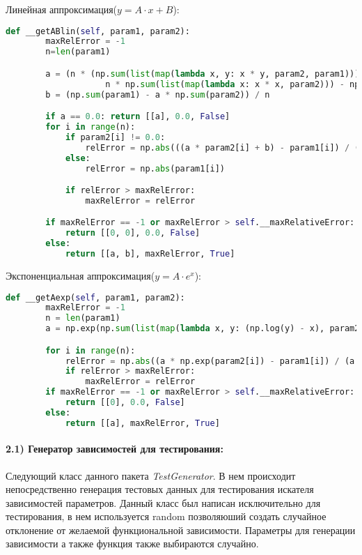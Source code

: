     Линейная аппроксимация($ y=A\cdot x + B$):
    \begin{lstlisting}[language=Python]
    def __getABlin(self, param1, param2):
        maxRelError = -1
        n=len(param1)

        a = (n * (np.sum(list(map(lambda x, y: x * y, param2, param1)))) - np.sum(param1) * np.sum(param2)) / (
                    n * np.sum(list(map(lambda x: x * x, param2))) - np.sum(param2) ** 2)
        b = (np.sum(param1) - a * np.sum(param2)) / n

        if a == 0.0: return [[a], 0.0, False]
        for i in range(n):
            if param2[i] != 0.0:
                relError = np.abs(((a * param2[i] + b) - param1[i]) / (a * param2[i] + b))
            else:
                relError = np.abs(param1[i])

            if relError > maxRelError:
                maxRelError = relError

        if maxRelError == -1 or maxRelError > self.__maxRelativeError:
            return [[0, 0], 0.0, False]
        else:
            return [[a, b], maxRelError, True]
    \end{lstlisting}

    Экспоненциальная аппроксимация($y=A\cdot e^x$):
    \begin{lstlisting}[language=Python]
        def __getAexp(self, param1, param2):
        maxRelError = -1
        n = len(param1)
        a = np.exp(np.sum(list(map(lambda x, y: (np.log(y) - x), param2, param1))) / n)

        for i in range(n):
            relError = np.abs((a * np.exp(param2[i]) - param1[i]) / (a * np.exp(param2[i])))
            if relError > maxRelError:
                maxRelError = relError
        if maxRelError == -1 or maxRelError > self.__maxRelativeError:
            return [[0], 0.0, False]
        else:
            return [[a], maxRelError, True]
    \end{lstlisting}

    \paragraph{2.1) Генератор зависимостей для тестирования:
    \\
    }
    Следующий класс данного пакета \textit{TestGenerator}. В нем происходит непосредственно генерация тестовых данных для тестирования искателя зависимостей параметров. Данный класс был написан исключительно для тестирования, в нем используется random позволяюший создать случайное отклонение от желаемой функциональной зависимости. Параметры для генерации зависимости а также функция также выбираются случайно.\\

